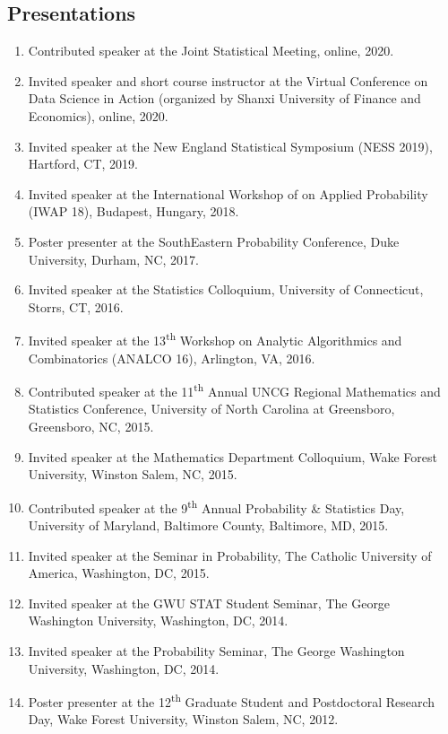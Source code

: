 \documentclass[margin]{res}
\begin{document}
\begin{resume}
\section{Presentations}
\begin{enumerate}
	\item Contributed speaker at the Joint Statistical Meeting, 
	online, 2020.
	\item Invited speaker and short course instructor at the Virtual 
	Conference on Data Science in Action (organized by Shanxi 
	University of Finance and Economics), online, 2020.
	\item Invited speaker at the New England Statistical Symposium (NESS 2019), Hartford, CT, 2019.
	\item Invited speaker at the International Workshop of on Applied Probability (IWAP 18), Budapest, Hungary, 2018.
	\item Poster presenter at the SouthEastern Probability Conference, Duke University, Durham, NC, 2017.
	\item Invited speaker at the Statistics Colloquium, University of Connecticut, Storrs, CT, 2016.
	\item Invited speaker at the 13\textsuperscript{th} Workshop on Analytic Algorithmics and Combinatorics (ANALCO 16), Arlington, VA, 2016.
	\item Contributed speaker at the 11\textsuperscript{th} Annual UNCG Regional Mathematics and Statistics Conference, University of North Carolina at Greensboro, Greensboro, NC, 2015.
	\item Invited speaker at the Mathematics Department Colloquium, Wake Forest University, Winston Salem, NC, 2015. 
	\item Contributed speaker at the 9\textsuperscript{th} Annual Probability \& Statistics Day, University of Maryland, Baltimore County, Baltimore, MD, 2015.
	\item Invited speaker at the Seminar in Probability, The Catholic University of America, Washington, DC, 2015.
	\item Invited speaker at the GWU STAT Student Seminar, The George Washington University, Washington, DC, 2014.
	\item Invited speaker at the Probability Seminar, The George Washington University, Washington, DC, 2014.
	\item Poster presenter at the 12\textsuperscript{th} Graduate Student and Postdoctoral Research Day, Wake Forest University, Winston Salem, NC, 2012.
\end{enumerate}


\end{resume}
\end{document}
